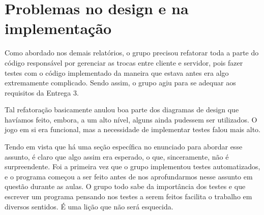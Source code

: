 \section{Problemas no design e na implementação}

Como abordado nos demais relatórios, o grupo precisou refatorar toda a parte do
código responsável por gerenciar as trocas entre cliente e servidor, pois fazer
testes com o código implementado da maneira que estava antes era algo extremamente
complicado. Sendo assim, o grupo agiu para se adequar aos requisitos da Entrega 3. 

Tal refatoração basicamente anulou boa parte dos diagramas de design que havíamos
feito, embora, a um alto nível, alguns ainda pudessem ser utilizados. O jogo em si
era funcional, mas a necessidade de implementar testes falou mais alto.
 
Tendo em vista que há uma seção específica no enunciado para abordar esse assunto,
é claro que algo assim era esperado, o que, sinceramente, não é surpreendente. Foi
a primeira vez que o grupo implementou testes automatizados, e o programa começou
a ser feito antes de nos aprofundarmos nesse assunto em questão durante as aulas.
O grupo todo sabe da importância dos testes e que escrever um programa pensando nos
testes a serem feitos facilita o trabalho em diversos sentidos. É uma lição que
não será esquecida.
